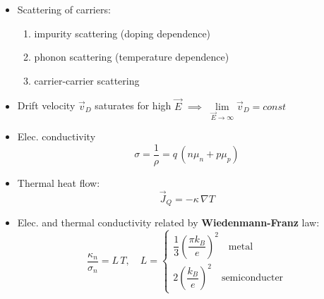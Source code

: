 \begin{itemize}
  \item Scattering of carriers:
        \begin{enumerate}
          \item impurity scattering (doping dependence)
          \item phonon scattering (temperature dependence)
          \item carrier-carrier scattering
        \end{enumerate}
        \item Drift velocity $\vec{v}_{D}$ saturates for high $\vec{E}$ $\implies$ $\lim\limits_{\vec{E} \to \infty} \vec{v}_{D} = const$
  \item Elec. conductivity
        \begin{equation*}
          \sigma = \dfrac{1}{\rho} = q \, (n\mu_{n} + p\mu_{p})
        \end{equation*}
  \item Thermal heat flow:
        \begin{equation*}
          \vec{J}_{Q} = -\kappa \, \nabla T
        \end{equation*}
  \item Elec. and thermal conductivity related by \textbf{Wiedenmann-Franz} law:
        \begin{equation*}
          \dfrac{\kappa_{n}}{\sigma_{n}} = L \, T, \quad L = \begin{cases} \dfrac{1}{3}{\left(\dfrac{\pi k_{B}}{e}\right)}^{2} \quad \text{metal}\\ 2{\left(\dfrac{k_{B}}{e}\right)}^{2} \quad \text{semiconducter} \end{cases}
        \end{equation*}
\end{itemize}
